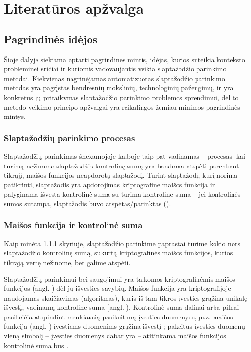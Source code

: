 \documentclass{VUMIFInfBakalaurinis}
\begin{document}
\section{Literatūros apžvalga}
\subsection{Pagrindinės idėjos}
Šioje dalyje siekiama aptarti pagrindines mintis, idėjas, kurios suteikia 
konteksto probleminei sričiai ir kuriomis vadovaujantis veikia slaptažodžio
parinkimo metodai. Kiekvienas nagrinėjamas automatizuotas slaptažodžio parinkimo 
metodas yra pagrįstas bendresnių mokslinių, technologinių pažengimų, ir yra 
konkretus jų pritaikymas slaptažodžio parinkimo problemos sprendimui, dėl to 
metodo veikimo principo apžvalgai yra reikalingos žemiau minimos pagrindinės 
mintys.

\subsubsection{Slaptažodžių parinkimo procesas} \label{sec:cracking}
Slaptažodžių parinkimas šnekamojoje kalboje taip pat vadinamas 
 -- procesas, kai turimą nežinomo slaptažodžio 
kontrolinę sumą yra bandoma atspėti parenkant tikrąjį, maišos funkcijos 
neapdorotą slaptažodį. Turint slaptažodį, kurį norima patikrinti, slaptažodis 
yra apdorojimas kriptografine maišos funkcija ir palyginama išvesta kontrolinė 
suma su turima kontroline suma -- jei kontrolinės sumos sutampa, slaptažodis 
buvo atspėtas/parinktas ().

\subsubsection{Maišos funkcija ir kontrolinė suma} \label{sec:hashing}
Kaip minėta \ref{sec:cracking} skyriuje, slaptažodžio parinkime paprastai turime 
kokio nors slaptažodžio kontrolinę sumą, sukurtą kriptografinės maišos 
funkcijos, kurios tikrąją vertę nežinome, bet galime atspėti.

Slaptažodžių parinkimui bei saugojimui yra taikomos kriptografinėmis maišos 
funkcijos (angl. ) dėl jų išvesties savybių. Maišos 
funkcija yra kriptografijoje naudojamas skaičiavimas (algoritmas), kuris iš tam 
tikros įvesties grąžina unikalę išvestį,
vadinamą kontroline suma (angl. ). Kontrolinė suma dalinai arba 
pilnai pasikeičia atspindint menkiausią pasikeitimą įvesties duomenyse, pvz. 
maišos funkcija  (angl. ) 
įvestiems duomenims  grąžina išvestį 
; pakeitus įvesties duomenų vieną 
simbolį -- įvesties duomenys dabar yra  -- atitinkama 
 maišos funkcijos kontrolinė suma bus 
.
\end{document}
